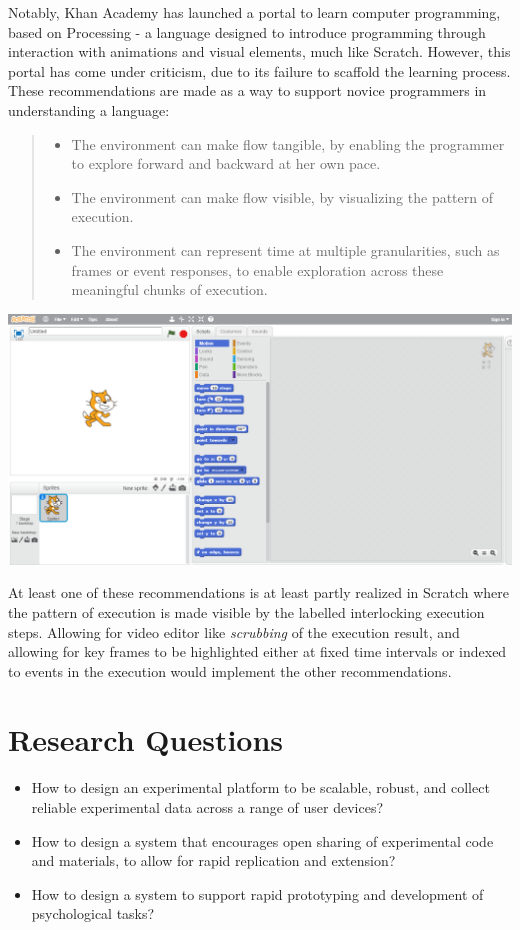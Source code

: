 \documentclass[12pt,a4paper,titlepage]{scrreprt}
\begin{document}
Notably, Khan Academy\cite{_computer_????} has launched a portal to learn computer programming, based on Processing - a language designed to introduce programming through interaction with animations and visual elements, much like Scratch\cite{peppler_supergoo_2007}. However, this portal has come under criticism\cite{victor_learnable_2012}, due to its failure to scaffold the learning process. These recommendations are made as a way to support novice programmers in understanding a language:
\begin{quote}
\begin{itemize}
\item The environment can make flow tangible, by enabling the programmer to explore forward and backward at her own pace.
\item The environment can make flow visible, by visualizing the pattern of execution.
\item The environment can represent time at multiple granularities, such as frames or event responses, to enable exploration across these meaningful chunks of execution.
\end{itemize}
\end{quote}
\includegraphics[scale=0.4]{Scratch_Layout}

At least one of these recommendations is at least partly realized in Scratch where the pattern of execution is made visible by the labelled interlocking execution steps. Allowing for video editor like \textit{scrubbing} of the execution result, and allowing for key frames to be highlighted either at fixed time intervals or indexed to events in the execution would implement the other recommendations.
\chapter{Research Questions}
\begin{itemize}
\item How to design an experimental platform to be scalable, robust, and collect reliable experimental data across a range of user devices?
\item How to design a system that encourages open sharing of experimental code and materials, to allow for rapid replication and extension?
\item How to design a system to support rapid prototyping and development of psychological tasks?
\end{itemize}
\end{document}
